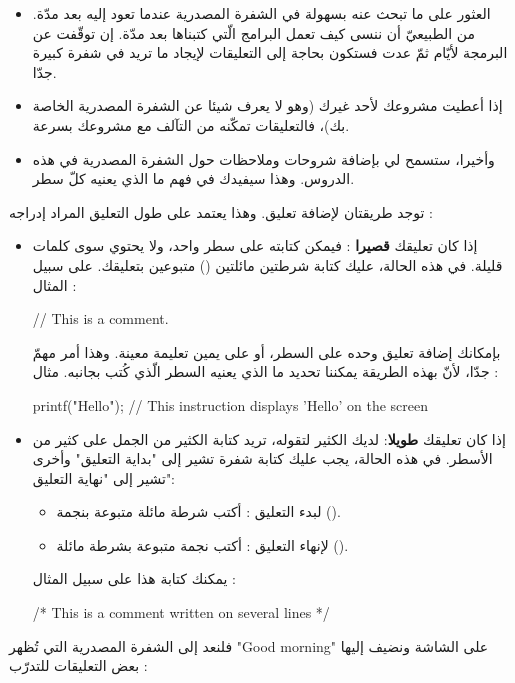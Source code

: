\begin{itemize}
  \item العثور على ما تبحث عنه بسهولة في الشفرة المصدرية عندما تعود إليه بعد مدّة. من الطبيعيّ أن ننسى كيف تعمل البرامج الّتي كتبناها بعد مدّة. إن توقّفت عن البرمجة لأيّام ثمّ عدت فستكون بحاجة إلى التعليقات لإيجاد ما تريد في شفرة كبيرة جدّا.
  \item إذا أعطيت مشروعك لأحد غيرك (وهو لا يعرف شيئا عن الشفرة المصدرية الخاصة بك)، فالتعليقات تمكّنه من التآلف مع مشروعك بسرعة.
  \item وأخيرا، ستسمح لي بإضافة شروحات وملاحظات حول الشفرة المصدرية في هذه الدروس. وهذا سيفيدك في فهم ما الذي يعنيه كلّ سطر.
\end{itemize}

توجد طريقتان لإضافة تعليق. وهذا يعتمد على طول التعليق المراد إدراجه :
\begin{itemize}
  \item إذا كان تعليقك
\textbf{قصيرا}
: فيمكن كتابته على سطر واحد، ولا يحتوي سوى كلمات قليلة. في هذه الحالة، عليك كتابة شرطتين مائلتين
(\InlineCode{//})
متبوعين بتعليقك. على سبيل المثال :

\begin{Csource}
// This is a comment.
\end{Csource}

بإمكانك إضافة تعليق وحده على السطر، أو على يمين تعليمة معينة. وهذا أمر مهمّ جدّا، لأنّ بهذه الطريقة يمكننا تحديد ما الذي يعنيه السطر الّذي كُتب بجانبه. مثال :

\begin{Csource}
printf("Hello"); // This instruction displays 'Hello' on the screen
\end{Csource}

  \item  إذا كان تعليقك
\textbf{طويلا}:
لديك الكثير لتقوله، تريد كتابة الكثير من الجمل على كثير من الأسطر. في هذه الحالة، يجب عليك كتابة شفرة تشير إلى "بداية التعليق" وأخرى تشير إلى "نهاية التعليق":
  \begin{itemize}
    \item لبدء التعليق : أكتب شرطة مائلة متبوعة بنجمة 
    (\InlineCode{/*}).
    \item لإنهاء التعليق : أكتب نجمة متبوعة بشرطة مائلة 
    (\InlineCode{*/}).
  \end{itemize}

  يمكنك كتابة هذا على سبيل المثال :
  
  \begin{Csource}
/* This is
a comment
written on several lines */
  \end{Csource}
\end{itemize}
فلنعد إلى الشفرة المصدرية التي تُظهر
"\textenglish{Good morning}"
على الشاشة ونضيف إليها بعض التعليقات للتدرّب :

